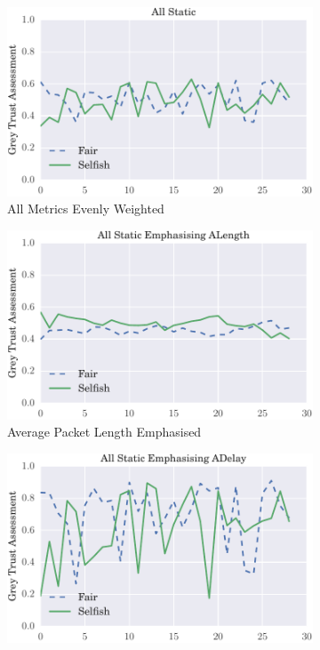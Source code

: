 \documentclass[runningheads,a4paper]{llncs}
\begin{document}
{{\begin{figure}
\begin{subfigure}{0.5\textwidth}
  \centering
  \includegraphics[width=.8\linewidth]{img/trust_bella_static_even_SelfishTargetSelection.pdf}
  \caption{All Metrics Evenly Weighted}
  \label{fig:beta_trust_static}
\end{subfigure}
\begin{subfigure}{0.5\textwidth}
  \centering
  \includegraphics[width=.8\linewidth]{img/trust_bella_static_emph_ALength_SelfishTargetSelection.pdf}
  \caption{Average Packet Length Emphasised}
  \label{fig:beta_trust_single}
\end{subfigure}
\begin{subfigure}{0.5\textwidth}
  \centering
  \includegraphics[width=.8\linewidth]{img/trust_bella_static_emph_ADelay_SelfishTargetSelection.pdf}

\end{subfigure}
\end{figure}}}
\end{document}
